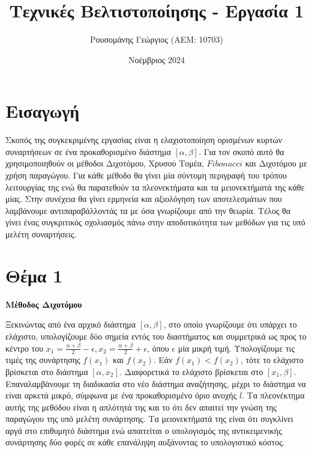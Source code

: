 \documentclass{article}
\title{Τεχνικές Βελτιστοποίησης - Εργασία 1}
\author{Ρουσομάνης Γεώργιος (ΑΕΜ: 10703)}
\date{Νοέμβριος 2024}
\begin{document}
\maketitle

\section*{Εισαγωγή}

Σκοπός της συγκεκριμένης εργασίας είναι η ελαχιστοποίηση ορισμένων κυρτών συναρτήσεων 
σε ένα προκαθορισμένο διάστημα $[\alpha, \beta]$. Για τον σκοπό αυτό θα χρησιμοποιηθούν 
οι μέθοδοι Διχοτόμου, Χρυσού Τομέα, $Fibonacci$ και Διχοτόμου με χρήση παραγώγου. Για κάθε 
μέθοδο θα γίνει μία σύντομη περιγραφή του τρόπου λειτουργίας της ενώ θα παρατεθούν τα 
πλεονεκτήματα και τα μειονεκτήματά της κάθε μίας. Στην συνέχεια θα γίνει ερμηνεία και αξιολόγηση 
των αποτελεσμάτων που λαμβάνουμε αντιπαραβάλλοντάς τα με όσα γνωρίζουμε από την θεωρία. 
Τέλος θα γίνει ένας συγκριτικός σχολιασμός πάνω στην αποδοτικότητα των μεθόδων για τις 
υπό μελέτη συναρτήσεις.

\section*{Θέμα 1}
\textbf{Μέθοδος Διχοτόμου}

Ξεκινώντας από ένα αρχικό διάστημα $[\alpha, \beta]$, στο οποίο γνωρίζουμε ότι υπάρχει 
το ελάχιστο, υπολογίζουμε δύο σημεία εντός του διαστήματος και συμμετρικά ως προς το 
κέντρο του $x_1=\frac{\alpha + \beta}{2} - \epsilon, x_2=\frac{\alpha + \beta}{2} + \epsilon$, 
όπου $\epsilon$ μία μικρή τιμή. Υπολογίζουμε τις τιμές της συνάρτησης $f(x_1)$ και $f(x_2)$. 
Εάν $f(x_1) < f(x_2)$, τότε το ελάχιστο βρίσκεται στο διάστημα $[\alpha, x_2]$. 
Διαφορετικά το ελάχιστο βρίσκεται στο $[x_1, \beta]$. Επαναλαμβάνουμε τη διαδικασία 
στο νέο διάστημα αναζήτησης, μέχρι το διάστημα να είναι αρκετά μικρό, 
σύμφωνα με ένα προκαθορισμένο όριο ανοχής $l$. Τα πλεονέκτημα αυτής της μεθόδου είναι η απλότητά
της και το ότι δεν απαιτεί την γνώση της παραγώγου της υπό μελέτη συνάρτησης. 
Τα μειονεκτήματά της είναι ότι συγκλίνει αργά στο επιθυμητό διάστημα ενώ απαιτείται ο υπολογισμός 
της αντικειμενικής συνάρτησης δύο φορές σε κάθε επανάληψη αυξάνοντας το υπολογιστικό κόστος.
\end{document}
